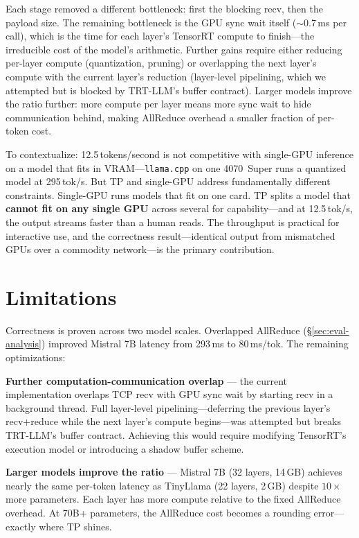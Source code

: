 \documentclass[10pt,twocolumn]{article}
\begin{document}
Each stage removed a different bottleneck: first the blocking recv, then
the payload size.  The remaining bottleneck is the GPU sync wait itself
($\sim$0.7\,ms per call), which is the time for each layer's TensorRT
compute to finish---the irreducible cost of the model's arithmetic.
Further gains require either reducing per-layer compute (quantization,
pruning) or overlapping the next layer's compute with the current layer's
reduction (layer-level pipelining, which we attempted but is blocked by
TRT-LLM's buffer contract).  Larger models improve the ratio further: more
compute per layer means more sync wait to hide communication behind,
making AllReduce overhead a smaller fraction of per-token cost.

To contextualize: 12.5\,tokens/second is not competitive with single-GPU
inference on a model that fits in VRAM---\texttt{llama.cpp} on one
4070~Super runs a quantized model at 295\,tok/s.  But TP and single-GPU
address fundamentally different constraints.  Single-GPU runs models that
fit on one card.  TP splits a model that \textbf{cannot fit on any single
GPU} across several for capability---and at 12.5\,tok/s, the output
streams faster than a human reads.  The throughput is practical for
interactive use, and the correctness result---identical output from
mismatched GPUs over a commodity network---is the primary contribution.

\section{Limitations}\label{sec:limitations}

Correctness is proven across two model scales.  Overlapped AllReduce
(\S\ref{sec:eval-analysis}) improved Mistral 7B latency from 293\,ms to
80\,ms/tok.  The remaining optimizations:

\textbf{Further computation-communication overlap} --- the current
implementation overlaps TCP recv with GPU sync wait by starting recv in a
background thread.  Full layer-level pipelining---deferring the previous
layer's recv+reduce while the next layer's compute begins---was attempted
but breaks TRT-LLM's buffer contract.  Achieving this would require
modifying TensorRT's execution model or introducing a shadow buffer scheme.

\textbf{Larger models improve the ratio} --- Mistral 7B (32 layers,
14\,GB) achieves nearly the same per-token latency as TinyLlama (22
layers, 2\,GB) despite $10\times$ more parameters.  Each layer has more
compute relative to the fixed AllReduce overhead.  At 70B+ parameters, the
AllReduce cost becomes a rounding error---exactly where TP shines.
\end{document}

